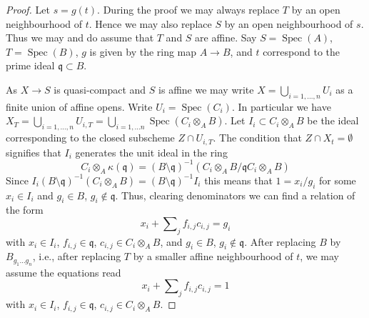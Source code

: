 \documentclass{stacks-project}
\theoremstyle{plain}
\theoremstyle{definition}
\theoremstyle{remark}
\numberwithin{equation}{subsection}
\def\Spec{\mathop{\mathrm{Spec}}}
\begin{document}
\begin{proof}
Let $s = g(t)$. During the proof we may always replace $T$ by an
open neighbourhood of $t$. Hence we may also replace $S$ by an open
neighbourhood of $s$. Thus we may and do assume that $T$ and $S$ are affine.
Say $S = \Spec(A)$, $T = \Spec(B)$, $g$ is given by the
ring map $A \to B$, and $t$ correspond to the prime ideal
$\mathfrak q \subset B$.

\medskip\noindent
As $X \to S$ is quasi-compact and $S$ is affine we may write
$X = \bigcup_{i = 1, \ldots, n} U_i$ as a finite union of affine opens.
Write $U_i = \Spec(C_i)$. In particular we have
$X_T = \bigcup_{i = 1, \ldots, n} U_{i, T} =
\bigcup_{i = 1, \ldots n} \Spec(C_i \otimes_A B)$.
Let $I_i \subset C_i \otimes_A B$ be the ideal corresponding to the
closed subscheme $Z \cap U_{i, T}$. The condition that
$Z \cap X_t = \emptyset$ signifies that $I_i$ generates the
unit ideal in the ring
$$
C_i \otimes_A \kappa(\mathfrak q) =
(B \setminus \mathfrak q)^{-1}\left(
C_i \otimes_A B/\mathfrak q C_i \otimes_A B \right)
$$
Since $I_i (B \setminus \mathfrak q)^{-1}(C_i \otimes_A B) =
(B \setminus \mathfrak q)^{-1} I_i$ this means that $1 = x_i/g_i$
for some $x_i \in I_i$ and $g_i \in B$, $g_i \not \in \mathfrak q$.
Thus, clearing denominators we can find a relation of the form
$$
x_i + \sum\nolimits_j f_{i, j}c_{i, j} = g_i
$$
with $x_i \in I_i$, $f_{i, j} \in \mathfrak q$, $c_{i, j} \in C_i \otimes_A B$,
and $g_i \in B$, $g_i \not \in \mathfrak q$. After replacing $B$ by
$B_{g_1 \ldots g_n}$, i.e., after replacing $T$ by a smaller affine
neighbourhood of $t$, we may assume the equations read
$$
x_i + \sum\nolimits_j f_{i, j}c_{i, j} = 1
$$
with $x_i \in I_i$, $f_{i, j} \in \mathfrak q$, $c_{i, j} \in C_i \otimes_A B$.


\end{proof}
\end{document}
